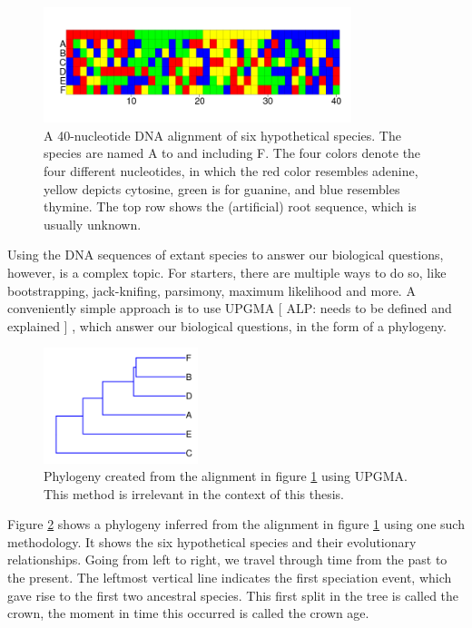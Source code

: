 \begin{figure}[H]
  \includegraphics[width=0.8\textwidth]{alignment_40_with_root.png}
  \caption{
    A 40-nucleotide DNA alignment of six hypothetical species. The species
    are named A to and including F. 
    The four colors denote the four different nucleotides,
    in which the red color resembles adenine, yellow depicts cytosine, 
    green is for guanine, and blue resembles thymine. The top
    row shows the (artificial) root sequence, which is usually unknown.
  }
  \label{fig:alignment}
\end{figure}

Using the DNA sequences of extant species to answer our biological questions,
however, is a complex topic. For starters, there are multiple 
ways to do so, like bootstrapping, 
jack-knifing, parsimony, maximum likelihood and more.
A conveniently simple approach is to use UPGMA 
[
  ALP:
  needs to be defined and explained
]
, which answer our biological
questions, in the form of a phylogeny.


\begin{figure}[H]
  \includegraphics[width=0.4\textwidth]{phylogeny_40_upgma.png}
  \caption{
    Phylogeny created from the alignment in figure \ref{fig:alignment} 
    using UPGMA. 
    This method is irrelevant in the context of this thesis.
  }
  \label{fig:phylogeny_upgma}
\end{figure}

Figure \ref{fig:phylogeny_upgma} shows a phylogeny inferred
from the alignment 
in figure \ref{fig:alignment} using one such methodology.
It shows the six hypothetical species and their evolutionary 
relationships. Going from left to right, we travel through time from 
the past to the present. 
The leftmost vertical line indicates the first speciation event, 
which gave rise to the first two ancestral species. 
This first split in the tree is called the crown,
the moment in time this occurred is called the crown age.

